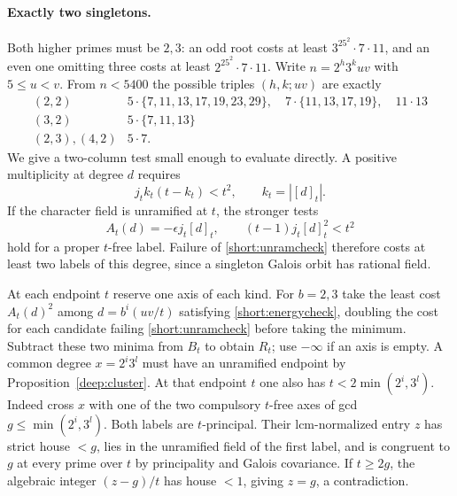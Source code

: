 \documentclass[11pt,a4paper]{article}
\numberwithin{equation}{section}
\theoremstyle{remark}
\begin{document}
\paragraph{Exactly two singletons.}
Both higher primes must be $2,3$: an odd root costs at least
$3^25^2\cdot7\cdot11$, and an even one omitting three costs at least
$2^25^2\cdot7\cdot11$. Write $n=2^h3^k uv$ with $5\le u<v$.
From $n<5400$ the possible triples $(h,k;uv)$ are exactly
\[
\begin{array}{c|l}
(2,2)&5\cdot\{7,11,13,17,19,23,29\},\quad7\cdot\{11,13,17,19\},\quad11\cdot13\\
(3,2)&5\cdot\{7,11,13\}\\
(2,3),(4,2)&5\cdot7 .
\end{array}
\]
We give a two-column test small enough to evaluate directly. A positive
multiplicity at degree $d$ requires
\begin{equation}\label{short:energycheck}
     j_t k_t(t-k_t)<t^2,\qquad k_t=|[d]_t|.
\end{equation}
If the character field is unramified at $t$, the stronger tests
\begin{equation}\label{short:unramcheck}
  A_t(d)=-\epsilon j_t[d]_t,\qquad (t-1)j_t[d]_t^2<t^2
\end{equation}
hold for a proper $t$-free label. Failure of \eqref{short:unramcheck}
therefore costs at least two labels of this degree, since a singleton
Galois orbit has rational field.

At each endpoint $t$ reserve one axis of each kind. For $b=2,3$ take
the least cost $A_t(d)^2$ among $d=b^i(uv/t)$ satisfying
\eqref{short:energycheck}, doubling the cost for each candidate failing
\eqref{short:unramcheck} before taking the minimum. Subtract these
two minima from $B_t$ to obtain $R_t$; use $-\infty$ if an axis is
empty. A common degree $x=2^i3^l$ must have an unramified endpoint
by Proposition~\ref{deep:cluster}. At that endpoint $t$ one also has
$t<2\min(2^i,3^l)$. Indeed cross $x$ with one of the two compulsory
$t$-free axes of gcd $g\le\min(2^i,3^l)$. Both labels are
$t$-principal. Their lcm-normalized entry $z$ has strict house $<g$,
lies in the unramified field of the first label, and is congruent to $g$
at every prime over $t$ by principality and Galois covariance.
If $t\ge2g$, the algebraic integer $(z-g)/t$ has house $<1$, giving
$z=g$, a contradiction.
\end{document}
